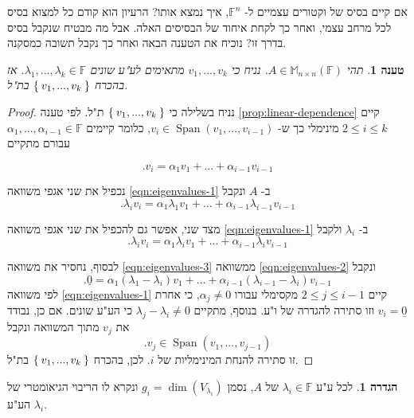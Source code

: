 \documentclass[12pt]{report}
\theoremstyle{plain}
\newtheorem{proposition}[theorem]{טענה}
\theoremstyle{definition}
\newtheorem{definition}[theorem]{הגדרה}
\newcommand{\F}{\mathbb{F}}
\newcommand{\M}{\mathbb{M}}
\newcommand{\0}{\mathbf{0}}
\DeclareMathOperator{\Span}{Span}
\begin{document}
אם קיים בסיס של וקטורים עצמיים 
ל-
$\F^n$,
איך נמצא אותו? הרעיון הוא קודם כל למצוא בסיס לכל מרחב עצמי, ואחר כך לקחת איחוד של הבסיסים האלה. אבל מה מבטיח שנקבל בסיס בדרך זו? נוכיח את הטענה הבאה ואחר כך נקבל תשובה כמסקנה.

\begin{proposition}\label{prop:distinct-eigenvalues}
תהי
$A\in\M_{n\times n}(\F)$.
נניח כי
$v_1,...,v_k$
מתאימים לע"ע שונים
$\lambda_1,...,\lambda_k\in\F$.
אז בהכרח
$\Set{v_1,...,v_k}$
בת"ל.
\end{proposition}

\begin{proof}
נניח בשלילה כי
$\Set{v_1,...,v_k}$
ת"ל. לפי טענה
\ref{prop:linear-dependence}
קיים 
$2\leq i\leq k$
מינימלי כך ש-
$v_i\in\Span(v_1,...,v_{i-1})$,
כלומר קיימים
$\alpha_1,...,\alpha_{i-1}\in\F$
עבורם מתקיים

\begin{equation}\label{eqn:eigenvalues-1}
.v_i=\alpha_1 v_1+...+\alpha_{i-1}v_{i-1}
\end{equation}

נכפיל את שני אגפי משוואה
\ref{eqn:eigenvalues-1}
ב-
$A$
ונקבל
\begin{equation}\label{eqn:eigenvalues-2}
.\lambda_i v_i=\alpha_1 \lambda_1 v_1+...+\alpha_{i-1}\lambda_{i-1}v_{i-1}
\end{equation}

מצד שני, אפשר גם להכפיל את שני אגפי משוואה
\ref{eqn:eigenvalues-1}
ב-
$\lambda_i$
ולקבל
\begin{equation}\label{eqn:eigenvalues-3}
.\lambda_i v_i=\alpha_1 \lambda_i v_1+...+\alpha_{i-1}\lambda_i v_{i-1}
\end{equation}

לבסוף, נחסיר את משוואה 
\ref{eqn:eigenvalues-3}
ממשוואה 
\ref{eqn:eigenvalues-2}
ונקבל
$$
.\underline{0}=\alpha_1 (\lambda_1-\lambda_i) v_1+...+\alpha_{i-1}(\lambda_{i-1}-\lambda_i) v_{i-1}
$$
לפי משוואה
\ref{eqn:eigenvalues-1}
קיים 
$2\leq j\leq i-1$
מקסימלי עבורו
$\alpha_j\neq 0$,
כי אחרת 
$v_i=\underline{0}$
וזו סתירה להגדרה של ו"ע. בנוסף, מתקיים
$\lambda_j-\lambda_i\neq 0$
כי הע"ע שונים. אם כן, נבודד את 
$v_j$
מתוך המשוואה ונקבל
$$
.v_j\in\Span(v_1,...,v_{j-1})
$$
זו סתירה להנחת המינימליות של
$i$. 
לכן, בהכרח
$\Set{v_1,...,v_k}$
בת"ל.
\end{proof}

\begin{definition}
לכל ע"ע
$\lambda_i\in\F$
של
$A$,
נסמן
$g_i=\dim(V_{\lambda_i})$
ונקרא לו הריבוי הגיאומטרי של הע"ע
$\lambda_i$.
\end{definition}
\end{document}
